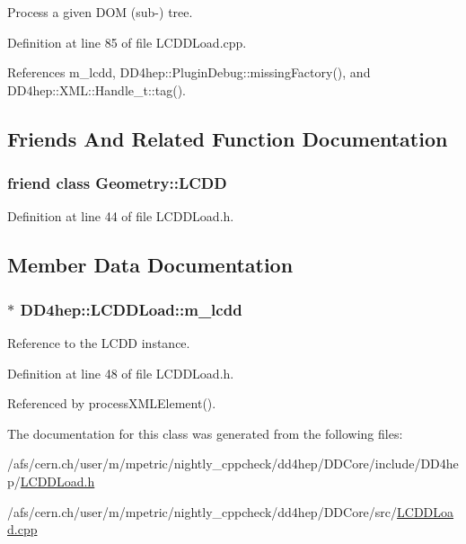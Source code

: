 Process a given DOM (sub-\/) tree. 

Definition at line 85 of file LCDDLoad.cpp.

References m\_\-lcdd, DD4hep::PluginDebug::missingFactory(), and DD4hep::XML::Handle\_\-t::tag().

\subsection{Friends And Related Function Documentation}
\hypertarget{class_d_d4hep_1_1_l_c_d_d_load_a6ad008feefc2e21d2190b244a0c96961}{
\subsubsection[{Geometry::LCDD}]{\setlength{\rightskip}{0pt plus 5cm}friend class {\bf Geometry::LCDD}}}
\label{class_d_d4hep_1_1_l_c_d_d_load_a6ad008feefc2e21d2190b244a0c96961}


Definition at line 44 of file LCDDLoad.h.

\subsection{Member Data Documentation}
\hypertarget{class_d_d4hep_1_1_l_c_d_d_load_a6420b6f11b8ee02144ef00bbeda63737}{
\subsubsection[{m\_\-lcdd}]{$\ast$ {\bf DD4hep::LCDDLoad::m\_\-lcdd}}}
\label{class_d_d4hep_1_1_l_c_d_d_load_a6420b6f11b8ee02144ef00bbeda63737}


Reference to the LCDD instance. 

Definition at line 48 of file LCDDLoad.h.

Referenced by processXMLElement().

The documentation for this class was generated from the following files:\begin{DoxyCompactItemize}
\item 
/afs/cern.ch/user/m/mpetric/nightly\_\-cppcheck/dd4hep/DDCore/include/DD4hep/\hyperlink{_l_c_d_d_load_8h}{LCDDLoad.h}\item 
/afs/cern.ch/user/m/mpetric/nightly\_\-cppcheck/dd4hep/DDCore/src/\hyperlink{_l_c_d_d_load_8cpp}{LCDDLoad.cpp}\end{DoxyCompactItemize}
